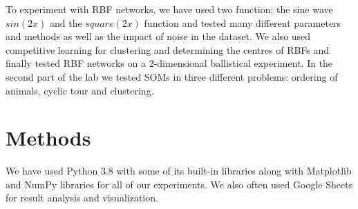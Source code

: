 \documentclass[a4paper]{article}
\begin{document}

To experiment with RBF networks, we have used two function: the sine wave $sin(2x)$ and the $square(2x)$ function and tested many different parameters and methods as well as the impact of noise in the dataset. We also used competitive learning for clustering and determining the centres of RBFs and finally tested RBF networks on a 2-dimensional ballistical experiment. In the second part of the lab we tested SOMs in three different problems: ordering of animals, cyclic tour and clustering.

\section{Methods}

We have used Python 3.8 with some of its built-in libraries along with Matplotlib and NumPy libraries for all of our experiments. We also often used Google Sheets for result analysis and visualization.




\end{document}
